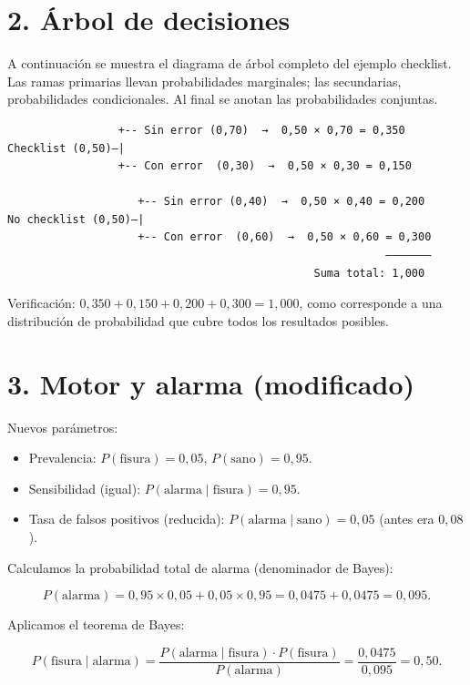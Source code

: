 \documentclass[11pt,letterpaper]{article}
\begin{document}
\section*{2. Árbol de decisiones}

A continuación se muestra el diagrama de árbol completo del ejemplo checklist. Las ramas primarias llevan probabilidades marginales; las secundarias, probabilidades condicionales. Al final se anotan las probabilidades conjuntas.

\begin{verbatim}
                 +-- Sin error (0,70)  →  0,50 × 0,70 = 0,350
Checklist (0,50)—|
                 +-- Con error  (0,30)  →  0,50 × 0,30 = 0,150

                    +-- Sin error (0,40)  →  0,50 × 0,40 = 0,200
No checklist (0,50)—|
                    +-- Con error  (0,60)  →  0,50 × 0,60 = 0,300
                                                          ———————
                                               Suma total: 1,000
\end{verbatim}

Verificación: $0{,}350 + 0{,}150 + 0{,}200 + 0{,}300 = 1{,}000$, como corresponde a una distribución de probabilidad que cubre todos los resultados posibles.

\section*{3. Motor y alarma (modificado)}

Nuevos parámetros:
\begin{itemize}
    \item Prevalencia: $P(\text{fisura}) = 0{,}05$, $P(\text{sano}) = 0{,}95$.
    \item Sensibilidad (igual): $P(\text{alarma} \mid \text{fisura}) = 0{,}95$.
    \item Tasa de falsos positivos (reducida): $P(\text{alarma} \mid \text{sano}) = 0{,}05$ (antes era $0{,}08$).
\end{itemize}

Calculamos la probabilidad total de alarma (denominador de Bayes):

\[
P(\text{alarma}) = 0{,}95 \times 0{,}05 + 0{,}05 \times 0{,}95 = 0{,}0475 + 0{,}0475 = 0{,}095.
\]

Aplicamos el teorema de Bayes:

\[
P(\text{fisura} \mid \text{alarma}) = \frac{P(\text{alarma} \mid \text{fisura}) \cdot P(\text{fisura})}{P(\text{alarma})} = \frac{0{,}0475}{0{,}095} = 0{,}50.
\]
\end{document}
